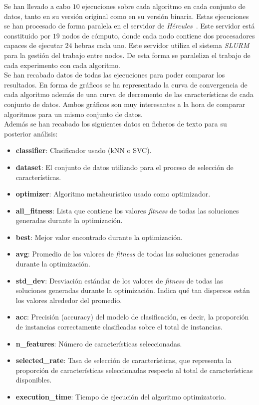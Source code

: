 Se han llevado a cabo $10$ ejecuciones sobre cada algoritmo en cada conjunto de datos, tanto en su versión original como en su versión binaria. Estas ejecuciones se han procesado de forma paralela en el servidor de \textit{Hércules}~\cite{citicugr}. Este servidor está constituido por $19$ nodos de cómputo, donde cada nodo contiene dos procesadores capaces de ejecutar $24$ hebras cada uno. Este servidor utiliza el sistema \textit{SLURM} para la gestión del trabajo entre nodos. De esta forma se paraleliza el trabajo de cada experimento con cada algoritmo.\\[6pt]
Se han recabado datos de todas las ejecuciones para poder comparar los resultados. En forma de gráficos se ha representado la curva de convergencia de cada algoritmo además de una curva de decremento de las características de cada conjunto de datos. Ambos gráficos son muy interesantes a la hora de comparar algoritmos para un mismo conjunto de datos.\\[6pt]
Además se han recabado los siguientes datos en ficheros de texto para su posterior análisis:
\begin{itemize}
    \item \textbf{classifier}: Clasificador usado (kNN o SVC).
    \item \textbf{dataset}: El conjunto de datos utilizado para el proceso de selección de características.
    \item \textbf{optimizer}: Algoritmo metaheurístico usado como optimizador.
    \item \textbf{all\_fitness}: Lista que contiene los valores \textit{fitness} de todas las soluciones generadas durante la optimización.
    \item \textbf{best}: Mejor valor encontrado durante la optimización.
    \item \textbf{avg}: Promedio de los valores de \textit{fitness} de todas las soluciones generadas durante la optimización.
    \item \textbf{std\_dev}: Desviación estándar de los valores de \textit{fitness} de todas las soluciones generadas durante la optimización. Indica qué tan dispersos están los valores alrededor del promedio.
    \item \textbf{acc}: Precisión (accuracy) del modelo de clasificación, es decir, la proporción de instancias correctamente clasificadas sobre el total de instancias.
    \item \textbf{n\_features}: Número de características seleccionadas.
    \item \textbf{selected\_rate}: Tasa de selección de características, que representa la proporción de características seleccionadas respecto al total de características disponibles.
    \item \textbf{execution\_time}: Tiempo de ejecución del algoritmo optimizatorio.
\end{itemize}
